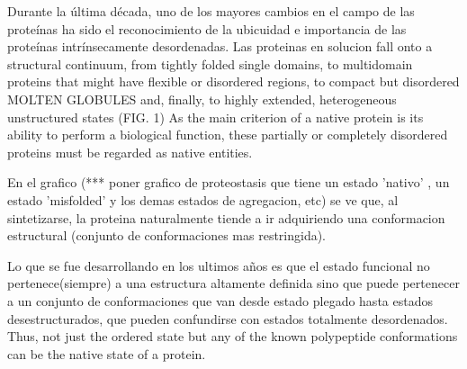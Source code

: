Durante la última década, uno de los mayores cambios en el campo de las proteínas ha sido el reconocimiento de la ubicuidad e importancia de las proteínas intrínsecamente desordenadas. 
Las proteinas en solucion fall onto a structural continuum, from tightly folded single domains, to multidomain proteins that might have flexible or disordered regions, to compact but disordered MOLTEN GLOBULES and, finally, to highly extended, heterogeneous unstructured states (FIG. 1) 
As the main criterion of a native protein is its ability to perform a biological function, these partially or completely disordered proteins must be regarded as native entities.







En el grafico (*** poner grafico de proteostasis que tiene un estado 'nativo' , un estado 'misfolded' y los demas estados de agregacion, etc) se ve que, al sintetizarse, 
la proteina naturalmente tiende a ir adquiriendo una conformacion estructural (conjunto de conformaciones mas restringida).

Lo que se fue desarrollando en los ultimos años es que el estado funcional no pertenece(siempre) a una estructura altamente definida sino que puede pertenecer a un conjunto de conformaciones que van desde
estado plegado hasta estados desestructurados, que pueden confundirse con estados totalmente desordenados. 
Thus, not just the ordered state but any of the known polypeptide conformations can be the native state of a protein.

